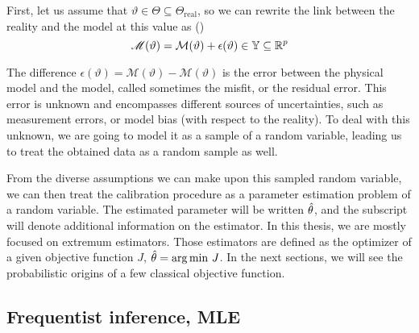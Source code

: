 \documentclass[../../Main_ManuscritThese.tex]{subfiles}
\begin{document}
First, let us assume that $\vartheta \in \Theta \subseteq \Theta_{\mathrm{real}}$, so we can rewrite the link between the reality and the model at this value as (\cite{kennedy_bayesian_2001,higdon_combining_2004})
\begin{equation}
  \label{eq:vartheta_models}
    \mathscr{M}(\vartheta) = %
    \mathcal{M}(\vartheta) + \epsilon(\vartheta) \in \Yspace \subseteq \mathbb{R}^p
  \end{equation}
 
  The difference $\epsilon(\vartheta) = \mathscr{M}(\vartheta) - \mathcal{M}(\vartheta)$ is the error between the physical model and the model, called sometimes the misfit, or the residual error.
  This error is unknown and encompasses different sources of uncertainties, such as measurement errors, or model bias (with respect to the reality). To deal with this unknown, we are going to model it as a sample of a random variable, leading us to treat the obtained data as a random sample as well.

  From the diverse assumptions we can make upon this sampled random variable, we can then treat the calibration procedure as a parameter estimation problem of a random variable.
  The estimated parameter will be written $\hat{\theta}$, and the subscript will denote additional information on the estimator. 
  In this thesis, we are mostly focused on extremum estimators. Those estimators are defined as the optimizer of a given objective function $J$, $\hat{\theta} = \operatorname*{arg\,min \,} J$. In the next sections, we will see the probabilistic origins of a few classical objective function.
\subsection{Frequentist inference, MLE}
\label{sec:frequentist_inference_MLE}
\end{document}
